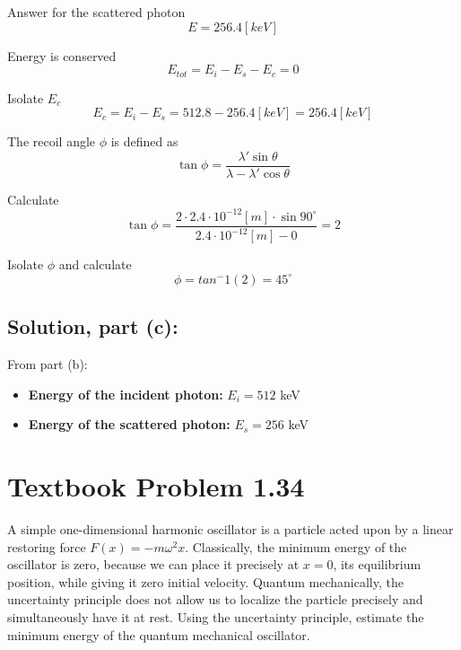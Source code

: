 \documentclass[12pt]{article}
\begin{document}
        Answer for the scattered photon
        \begin{equation}
            E = 256.4 [keV]
        \end{equation}

        Energy is conserved
        \begin{equation}
            E_{tot} = E_i - E_s - E_c = 0
        \end{equation}

        Isolate $E_c$
        \begin{equation}
            E_c = E_i - E_s = 512.8 - 256.4 [keV] = 256.4 [keV]
        \end{equation}
        
        The recoil angle $\phi$ is defined as
        \begin{equation}
            \tan \phi = \frac{ \lambda' \sin \theta }{\lambda - \lambda' \cos \theta}
        \end{equation}

        Calculate
        \begin{equation}
            \tan \phi = \frac{2 \cdot 2.4 \cdot 10^{-12} [m] \cdot \sin 90 ^{\circ}}{2.4 \cdot 10^{-12} [m] - 0} = 2
        \end{equation}

        Isolate $\phi$ and calculate
        \begin{equation}
            \phi = tan^-1(2) = 45^{\circ}
        \end{equation}

        \subsection*{Solution, part (c):}
        From part (b):
        \begin{itemize}
            \item \textbf{Energy of the incident photon:} $E_i = 512$ keV
            \item \textbf{Energy of the scattered photon:} $E_s = 256$ keV
        \end{itemize}
   
\section*{Textbook Problem 1.34}
    A simple one-dimensional harmonic oscillator is a particle acted upon by a linear restoring force $F(x) = -m \omega^2 x$. Classically, the minimum energy of the oscillator is zero, because we can place it precisely at $x=0$, its equilibrium position, while giving it zero initial velocity. Quantum mechanically, the uncertainty principle does not allow us to localize the particle precisely and simultaneously have it at rest. Using the uncertainty principle, estimate the minimum energy of the quantum mechanical oscillator.
\end{document}
